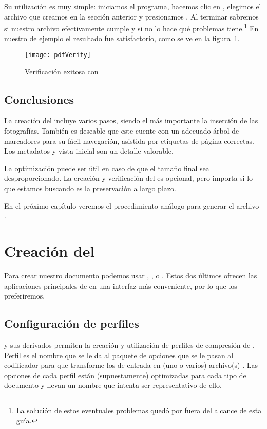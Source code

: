 \documentclass[%
	a5paper,
	10pt,
	twoside,
	openright,
	final,
]{memoir}
\begin{document}
	Su utilización es muy simple: iniciamos el programa, hacemos clic en , elegimos el archivo que creamos en la sección anterior y presionamos . Al terminar sabremos si nuestro archivo efectivamente cumple y si no lo hace qué problemas tiene.\footnote{La solución de estos eventuales problemas quedó por fuera del alcance de esta guía.} En nuestro \pdf de ejemplo el resultado fue satisfactorio, como se ve en la figura~\ref{fig:pdfVerify}.

	\begin{figure}
		\texttt{[image: pdfVerify]}
		\caption{Verificación exitosa con \veraPDF\label{fig:pdfVerify}}
	\end{figure}

	\section{Conclusiones} La creación del \pdf incluye varios pasos, siendo el más importante la inserción de las fotografías. También es deseable que este cuente con un adecuado árbol de marcadores para su fácil navegación, asistida por etiquetas de página correctas. Los metadatos y vista inicial son un detalle valorable.

	La optimización puede ser útil en caso de que el tamaño final sea desproporcionado. La creación y verificación del \pdfa es opcional, pero importa si lo que estamos buscando es la preservación a largo plazo.

	En el próximo capítulo veremos el procedimiento análogo para generar el archivo \djvu.

	\chapter{Creación del \texorpdfstring{\djvu}{DjVu}} Para crear nuestro documento \djvu podemos usar \djvulibre, \dexpress, \djvusmall o \djvusmallmod. Estos dos últimos ofrecen las aplicaciones principales de \dexpress en una interfaz más conveniente, por lo que los preferiremos.

	\section{Configuración de perfiles\label{sec:profiles}} \dexpress y sus derivados permiten la creación y utilización de perfiles de compresión de \djvu. Perfil es el nombre que se le da al paquete de opciones que se le pasan al codificador para que transforme los \tiff de entrada en (uno o varios) archivo(s) \djvu. Las opciones de cada perfil están (supuestamente) optimizadas para cada tipo de documento y llevan un nombre que intenta ser representativo de ello.
\end{document}
